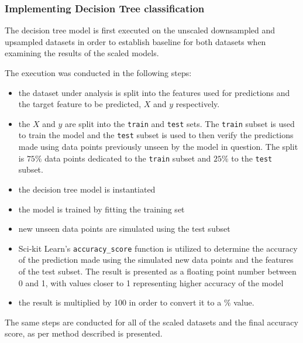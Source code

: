 \subsubsection{Implementing Decision Tree classification}
The decision tree model is first executed on the unscaled downsampled and upsampled datasets in order to establish baseline for both datasets when examining the results of the scaled models.

The execution was conducted in the following steps:\
\begin{itemize}
    \item the dataset under analysis is split into the features used for predictions and the target feature to be predicted, $X$ and $y$ respectively.
    \item the $X$ and $y$ are split into the \texttt{train} and \texttt{test} sets. The \texttt{train} subset is used to train the model and the \texttt{test} subset is used to then verify the predictions made using data points previously unseen by the model in question. The split is $75\%$ data points dedicated to the \texttt{train} subset and $25\%$ to the \texttt{test} subset.
    \item the decision tree model is instantiated
    \item the model is trained by fitting the training set 
    \item new unseen data points are simulated using the test subset
    \item Sci-kit Learn's \texttt{accuracy\_score} function is utilized to determine the accuracy of the prediction made using the simulated new data points and the features of the test subset. The result is presented as a floating point number between 0 and 1, with values closer to 1 representing higher accuracy of the model
    \item the result is multiplied by 100 in order to convert it to a $\%$ value.
\end{itemize}

The same steps are conducted for all of the scaled datasets and the final accuracy score, as per method described is presented.
